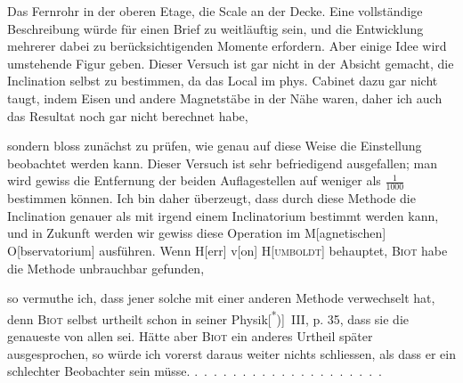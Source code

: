Das Fernrohr in der oberen Etage, die Scale an der Decke. Eine vollständige
Beschreibung würde für einen Brief zu weitläuftig sein, und die Entwicklung
mehrerer dabei zu berücksichtigenden Momente erfordern. Aber
einige Idee wird umstehende Figur geben. Dieser Versuch ist gar nicht in
der Absicht gemacht, die Inclination selbst zu bestimmen, da das Local im
phys. Cabinet dazu gar nicht taugt, indem Eisen und andere Magnetstäbe in
\clearpage{}
\noindent der Nähe waren, daher ich auch das Resultat noch gar nicht berechnet habe,
\par\noindent\begin{minipage}[t]{.29\linewidth}\vspace{0pt}\centering

\end{minipage}\hfill\begin{minipage}[t]{.67\linewidth}\vspace{0pt}
\noindent sondern bloss zunächst zu prüfen, wie genau auf
diese Weise die Einstellung beobachtet werden
kann. Dieser Versuch ist sehr befriedigend ausgefallen;
man wird gewiss die Entfernung der
beiden Auflagestellen auf weniger als \(\frac{1}{1000}\) bestimmen
können. Ich bin daher überzeugt, dass
durch diese Methode die Inclination genauer als
mit irgend einem Inclinatorium bestimmt werden
kann, und in Zukunft werden wir gewiss diese
Operation im M[agnetischen] O[bservatorium] ausführen.
Wenn H[err] v[on] \textsc{H[umboldt]} behauptet,
\textsc{Biot} habe die Methode unbrauchbar gefunden,
\end{minipage}\par\noindent
so vermuthe ich, dass jener solche mit einer anderen Methode verwechselt
hat, denn \textsc{Biot} selbst urtheilt schon in seiner Physik[\textsuperscript{*})]\begingroup\renewcommand{\thefootnote}{}\endgroup\ III, p. 35, dass sie
die genaueste von allen sei. Hätte aber \textsc{Biot} ein anderes Urtheil später ausgesprochen,
so würde ich vorerst daraus weiter nichts schliessen, als dass er
ein schlechter Beobachter sein müsse. \mbox{.\ .\ .\ .\ .\ .\ .\ .\ .\ .\ .\ .\ .\ .\ .\ .\ .\ .\ .\ .}
\clearpage\endgroup
